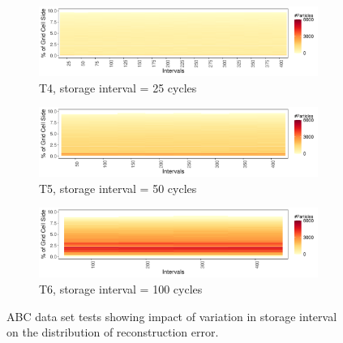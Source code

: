 \begin{figure}[!ht]
\begin{subfigure}{0.33\linewidth}
\centering
\includegraphics[width=\linewidth]{Images/ABC_Intervals_T4.pdf}
\vspace{-6mm}
\caption{T4, storage interval = 25 cycles}
\label{fig:abc_4}
\end{subfigure}
\begin{subfigure}{0.33\linewidth}
\centering
\includegraphics[width=\linewidth]{Images/ABC_Intervals_T5.pdf}
\vspace{-6mm}
\caption{T5, storage interval = 50 cycles}
\label{fig:abc_5}
\end{subfigure}
\begin{subfigure}{0.33\linewidth}
\centering
\includegraphics[width=\linewidth]{Images/ABC_Intervals_T6.pdf}
\vspace{-6mm}
\caption{T6, storage interval = 100 cycles}
\label{fig:abc_6}
\end{subfigure}
\caption{ABC data set tests showing impact of variation in storage interval on the distribution of reconstruction error.}
\label{fig:abc_map}
\vspace{-4mm}
\end{figure}
